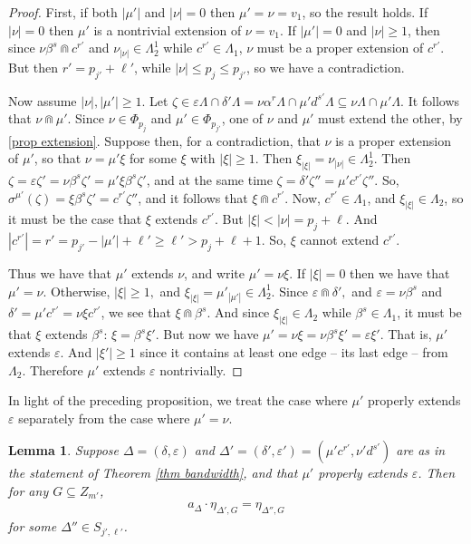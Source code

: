 \documentclass[12pt]{amsart}
\newcommand{\sse}{\subseteq}
\newcommand{\al}{\alpha}
\newcommand{\be}{\beta}
\newcommand{\de}{\delta}
\newcommand{\De}{\Delta}
\newcommand{\ep}{\varepsilon}
\newcommand{\ze}{\zeta}
\newcommand{\La}{\Lambda}
\newcommand{\si}{\sigma}
\theoremstyle{plain} %
\newtheorem{Lemma}[Theorem]{Lemma}
\theoremstyle{definition} %
\begin{document}
\begin{proof}
    First, if both $|\mu'|$ and $|\nu| = 0$ then $\mu' = \nu = v_1$, so the result holds. If $|\nu| = 0$ then $\mu'$ is a nontrivial extension of $\nu = v_1$.
    If $|\mu'| = 0$ and $|\nu| \geq 1$, then since $\nu \be^s \Cap c^{r'}$ and $\nu_{|\nu|} \in \La_2^1$ while $c^{r'} \in \La_1$, $\nu$ must be a proper extension of $c^{r'}$. But then $r' = p_{j'} + \ell'$, while $|\nu| \leq p_j \leq p_{j'}$, so we have a contradiction.


    Now assume $|\nu|, |\mu'| \geq 1$.
    Let $\ze \in \ep\La \cap \de' \La = \nu\al^r \La \cap \mu' d^{s'} \La \sse \nu \La \cap \mu' \La$. It follows that $\nu \Cap \mu'$. Since $\nu \in \Phi_{p_{j}}$ and $\mu' \in \Phi_{p_{j'}}$, one of $\nu$ and $\mu'$ must extend the other, by \ref{prop extension}.
    Suppose then, for a contradiction, that $\nu$ is a proper extension of $\mu'$, so that $\nu = \mu' \xi$ for some $\xi$ with $|\xi| \ge 1$. Then $\xi_{|\xi|} = \nu_{|\nu|} \in \La_2^1$.
    Then $\ze = \ep \ze' = \nu\be^s \ze' = \mu' \xi \be^s\ze'$, and at the same time $\ze = \de' \ze'' = \mu' c^{r'} \ze''$. So, $\si^{\mu'}(\ze) = \xi \be^s \ze' = c^{r'} \ze''$, and it follows that $\xi \Cap c^{r'}$. Now, $c^{r'} \in \La_1$, and $\xi_{|\xi|} \in \La_2$, so it must be the case that $\xi$ extends $c^{r'}$. But $|\xi| < |\nu| = p_j + \ell$. And $|c^{r'}| = r' = p_{j'} - |\mu'| + \ell' \ge \ell' > p_j + \ell + 1$. So, $\xi$ cannot extend $c^{r'}$.

    Thus we have that $\mu'$ extends $\nu$, and write $\mu' = \nu \xi$. If $|\xi| = 0$ then we have that $\mu' = \nu$. Otherwise, $|\xi| \ge 1,$ and $\xi_{|\xi|} = \mu'_{|\mu'|} \in \La_2^1$. Since $\ep \Cap \de',$ and $\ep = \nu \be^s$ and $\de' = \mu' c^{r'} = \nu \xi c^{r'}$, we see that $\xi \Cap \be^s$. And since $\xi_{|\xi|} \in \La_2$ while $\be^s \in \La_1$, it must be that $\xi$ extends $\be^s$: $\xi = \be^s \xi'$. But now we have $\mu' = \nu \xi = \nu \be^s \xi' = \ep \xi'$. That is, $\mu'$ extends $\ep$. And $|\xi'| \ge 1$ since it contains at least one edge -- its last edge -- from $\La_2$. Therefore $\mu'$ extends $\ep$ nontrivially.
\end{proof}


In light of the preceding proposition, we treat the case where $\mu'$ properly extends $\ep$ separately from the case where $\mu' = \nu$.

\begin{Lemma}\label{lem a acts on vector 1} Suppose $\De = (\de, \ep)$ and $\De' = (\de', \ep') = (\mu'c^{r'}, \nu' d^{s'})$ are as in the statement of Theorem \ref{thm bandwidth},
    and that $\mu'$ properly extends $\ep$. Then for any $G \sse Z_{m'}$, \begin{align*}
        a_{\De} \cdot \eta_{\De',G} = \eta_{\De'', G}
    \end{align*}
    for some $\De'' \in S_{j', \ell'}$.
\end{Lemma}
\end{document}
